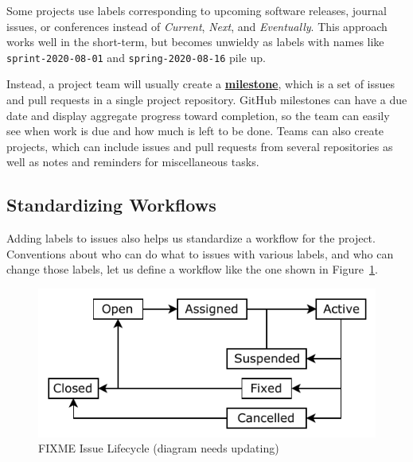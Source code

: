 \documentclass[
]{krantz}
\newcommand{\gref}[2]{\hyperlink{#2}{\textbf{#1}}}
\begin{document}
Some projects use labels corresponding to upcoming software releases, journal issues, or conferences
instead of \emph{Current}, \emph{Next}, and \emph{Eventually}.
This approach works well in the short-term,
but becomes unwieldy as labels with names like \texttt{sprint-2020-08-01} and \texttt{spring-2020-08-16} pile up.

Instead,
a project team will usually create a \gref{milestone}{milestone},
which is a set of issues and pull requests in a single project repository.
GitHub milestones can have a due date
and display aggregate progress toward completion,
so the team can easily see when work is due and how much is left to be done.
Teams can also create projects,
which can include issues and pull requests from several repositories
as well as notes and reminders for miscellaneous tasks.

\hypertarget{teams-workflow}{%
\subsection{Standardizing Workflows}\label{teams-workflow}}

Adding labels to issues also helps us standardize a workflow for the project.
Conventions about who can do what to issues with various labels,
and who can change those labels,
let us define a workflow like the one shown in Figure~\ref{fig:teams-lifecycle}.

\begin{figure}

{\centering \includegraphics[width=1\linewidth]{figures/teams/lifecycle} 

}

\caption{FIXME Issue Lifecycle (diagram needs updating)}\label{fig:teams-lifecycle}
\end{figure}
\end{document}
